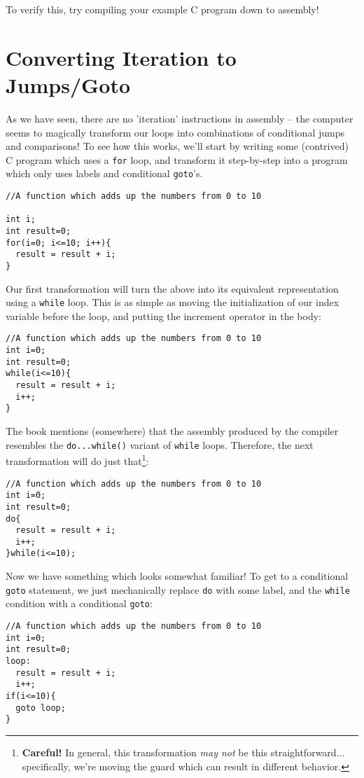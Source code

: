 \documentclass[10pt]{article}
\begin{document}
\noindent To verify this, try compiling your example C program down to assembly!

\section{Converting Iteration to Jumps/Goto}
As we have seen, there are no 'iteration' instructions in assembly -- the computer seems to magically transform our loops into combinations of conditional jumps and comparisons! To see how this works, we'll start by writing some (contrived) C program which uses a \texttt{for} loop, and transform it step-by-step into a program which only uses labels and conditional \texttt{goto}'s.

\begin{lstlisting}
//A function which adds up the numbers from 0 to 10

int i;
int result=0;
for(i=0; i<=10; i++){
  result = result + i;
}
\end{lstlisting}
\noindent Our first transformation will turn the above into its equivalent representation using a \texttt{while} loop. This is as simple as moving the initialization of our index variable before the loop, and putting the increment operator in the body:

\begin{lstlisting}
//A function which adds up the numbers from 0 to 10
int i=0;
int result=0;
while(i<=10){
  result = result + i;
  i++;
}
\end{lstlisting}

\noindent The book mentions (somewhere) that the assembly produced by the compiler resembles the \texttt{do...while()} variant of \texttt{while} loops. Therefore, the next transformation will do just that\footnote{\textbf{Careful!} In general, this transformation \textit{may not} be this straightforward... specifically, we're moving the guard which can result in different behavior.}:

\begin{lstlisting}
//A function which adds up the numbers from 0 to 10
int i=0;
int result=0;
do{
  result = result + i;
  i++;
}while(i<=10);
\end{lstlisting}

\noindent Now we have something which looks somewhat familiar! To get to a conditional \texttt{goto} statement, we just mechanically replace \texttt{do} with some label, and the \texttt{while} condition with a conditional \texttt{goto}:

\begin{lstlisting}
//A function which adds up the numbers from 0 to 10
int i=0;
int result=0;
loop:
  result = result + i;
  i++;
if(i<=10){
  goto loop;
}
\end{lstlisting}
\end{document}

